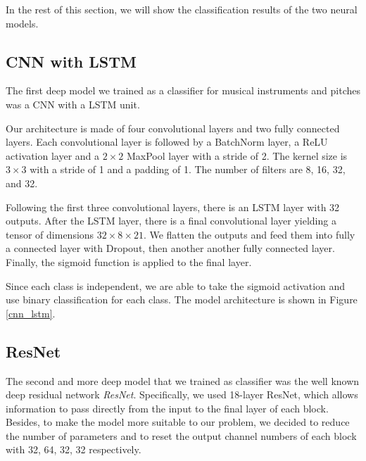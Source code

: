 \documentclass{article}
\begin{document}
In the rest of this section, we will show the classification results of the two neural models. 

\subsection{CNN with LSTM}

The first deep model we trained as a classifier for musical instruments and pitches was a CNN with a LSTM unit. 


Our architecture is made of four convolutional layers and two fully connected layers. Each convolutional layer is followed by a BatchNorm layer, a ReLU activation layer and a $2 \times 2$  MaxPool layer with a stride of 2. The kernel size is $3 \times 3$ with a stride of 1 and a padding of 1. The number of filters are 8, 16, 32, and 32.

Following the first three convolutional layers, there is an LSTM layer with 32 outputs. After the LSTM layer, there is a final convolutional layer yielding a tensor of dimensions $32\times 8 \times 21$. We flatten the outputs and feed them into fully a connected layer with Dropout, then another another fully connected layer. Finally, the sigmoid function is applied to the final layer. 

Since each class is independent, we are able to take the sigmoid activation and use binary classification for each class. The model architecture is shown in Figure \ref{cnn_lstm}.

\subsection{ResNet}

The second and more deep model that we trained as classifier was the well known deep residual network \emph{ResNet}. Specifically, we used 18-layer ResNet, which allows information to pass directly from the input to the final layer of each block. Besides, to make the model more suitable to our problem, we decided to reduce the number of parameters and to reset the output channel numbers of each block with 32, 64, 32, 32 respectively.
\end{document}
